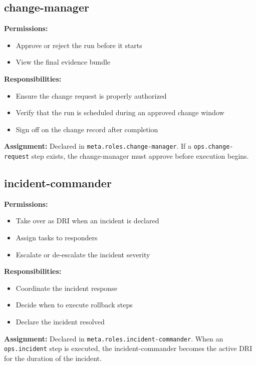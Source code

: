 \subsection{change-manager}

\textbf{Permissions:}
\begin{itemize}
  \item Approve or reject the run before it starts
  \item View the final evidence bundle
\end{itemize}

\textbf{Responsibilities:}
\begin{itemize}
  \item Ensure the change request is properly authorized
  \item Verify that the run is scheduled during an approved change window
  \item Sign off on the change record after completion
\end{itemize}

\textbf{Assignment:} Declared in \texttt{meta.roles.change-manager}. If a \texttt{ops.change-request} step exists, the change-manager must approve before execution begins.

\subsection{incident-commander}

\textbf{Permissions:}
\begin{itemize}
  \item Take over as DRI when an incident is declared
  \item Assign tasks to responders
  \item Escalate or de-escalate the incident severity
\end{itemize}

\textbf{Responsibilities:}
\begin{itemize}
  \item Coordinate the incident response
  \item Decide when to execute rollback steps
  \item Declare the incident resolved
\end{itemize}

\textbf{Assignment:} Declared in \texttt{meta.roles.incident-commander}. When an \texttt{ops.incident} step is executed, the incident-commander becomes the active DRI for the duration of the incident.

